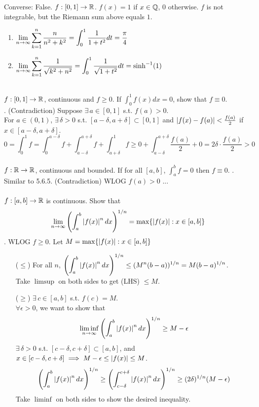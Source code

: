 Converse: False. $f:[0, 1]\rightarrow \mathbb{R}$. $f(x) = 1$ if $x\in \mathbb{Q}$, $0$ otherwise. $f$ is not integrable, but the Riemann sum above equals $1$.
\\
\prob{} 
\begin{enumerate}
	\item $\displaystyle \lim_{n\rightarrow\infty} \sum_{k=1}^n \frac{n}{n^2+k^2} = \int_0^1 \frac{1}{1+t^2}dt = \frac{\pi}{4}$ 
	\item $\displaystyle \lim_{n\rightarrow\infty} \sum_{k=1}^n \frac{1}{\sqrt{k^2+n^2}} = \int_0^1 \frac{1}{\sqrt{1+t^2}}dt = \sinh^{-1}(1)$
\end{enumerate}~\\
 $f:[0, 1]\rightarrow\mathbb{R}$, continuous and $f\geq 0$. If $\int_0^1 f(x)dx = 0$, show that $f \equiv 0$.\\
\pf. (Contradiction) Suppose $\exists\,a\in[0, 1]$ s.t. $f(a) > 0$.\\
For $a\in (0, 1)$, $\exists\,\delta > 0$ s.t. $[a-\delta, a +\delta] \subset [0, 1]$ and $\left|f(x) - f(a)\right| < \frac{f(a)}{2}$ if $x\in [a-\delta, a+\delta]$.
$$0 =\int_0^1 f = \int_0^{a-\delta} f + \int_{a-\delta}^{a+\delta} f+ \int_{a+\delta}^1 f \geq 0 + \int_{a-\delta}^{a+\delta} \frac{f(a)}{2} + 0 = 2\delta \cdot \frac{f(a)}{2} > 0$$
\\
 $f:\mathbb{R}\rightarrow\mathbb{R}$, continuous and bounded. If for all $[a, b]$, $\int_a^b f = 0$ then $f\equiv 0$.
\pf. Similar to 5.6.5. (Contradiction) WLOG $f(a) > 0$ ...\\
\\
 $f:[a, b]\rightarrow\mathbb{R}$ is continuous. Show that
$$\lim_{n\rightarrow\infty} \left(\int_a^b \left|f(x)\right|^n dx\right)^{1/n} = \max\{\left|f(x)\right|: x\in [a, b] \}$$
\pf. WLOG $f\geq 0$. Let $M = \max\{\left|f(x)\right|: x\in [a, b]\}$
\begin{enumerate}
	\item[($\leq$)] For all $n$, $\displaystyle \left(\int_a^b \left|f(x)\right|^n dx\right)^{1/n} \leq (M^n (b-a))^{1/n} = M(b-a)^{1/n}$.\\
	Take $\limsup$ on both sides to get (LHS) $\leq M$.
	\item[($\geq$)] $\exists\,c\in[a, b]$ s.t. $f(c) = M$.\\
	$\forall\epsilon > 0$, we want to show that $$\liminf_{n\rightarrow\infty} \left(\int_a^b \left|f(x)\right|^ndx\right)^{1/n} \geq M - \epsilon$$
	$\exists\,\delta >0$ s.t. $[c-\delta, c+\delta]\subset [a, b]$, and $x\in [c-\delta, c+\delta] \implies M - \epsilon \leq \left|f(x)\right| \leq M$.
	$$\left(\int_a^b \left|f(x)\right|^ndx\right)^{1/n} \geq \left(\int_{c-\delta}^{c+\delta} \left|f(x)\right|^n dx\right)^{1/n} \geq (2\delta)^{1/n} (M-\epsilon)$$
	Take $\liminf$ on both sides to show the desired inequality.
\end{enumerate}

\pagebreak